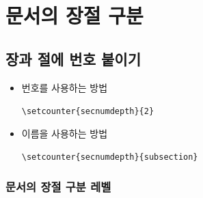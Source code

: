 \documentclass[12pt, a4paper, oneside]{book}
\let\stdsection\section
\renewcommand\section{\newpage\stdsection}
\begin{document}
	\chapter{문서의 장절 구분}



	\newpage
	\section{장과 절에 번호 붙이기}
	\null


	\begin{itemize}
	\item	번호를 사용하는 방법
			\begin{framed}
			\verb|\setcounter{secnumdepth}{2}|
			\end{framed}

	\item	이름을 사용하는 방법
			\begin{framed}
			\verb|\setcounter{secnumdepth}{subsection}|
			\end{framed}
	\end{itemize}




			\subsection{문서의 장절 구분 레벨}
	
\end{document}
